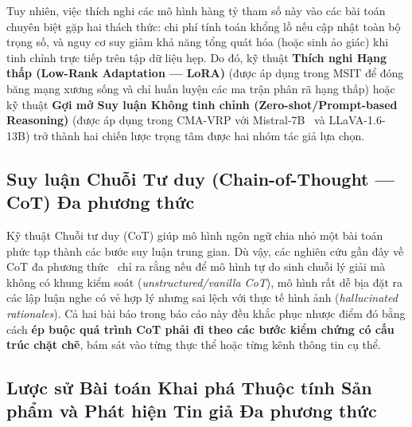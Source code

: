 \documentclass[conference,10pt]{IEEEtran}
\begin{document}
Tuy nhiên, việc thích nghi các mô hình hàng tỷ tham số này vào các bài toán chuyên biệt gặp hai thách thức: chi phí tính toán khổng lồ nếu cập nhật toàn bộ trọng số, và nguy cơ suy giảm khả năng tổng quát hóa (hoặc sinh ảo giác) khi tinh chỉnh trực tiếp trên tập dữ liệu hẹp. Do đó, kỹ thuật \textbf{Thích nghi Hạng thấp (Low-Rank Adaptation --- LoRA)} (được áp dụng trong MSIT để đóng băng mạng xương sống và chỉ huấn luyện các ma trận phân rã hạng thấp) hoặc kỹ thuật \textbf{Gợi mở Suy luận Không tinh chỉnh (Zero-shot/Prompt-based Reasoning)} (được áp dụng trong CMA-VRP với Mistral-7B~\cite{jiang2023mistral} và LLaVA-1.6-13B) trở thành hai chiến lược trọng tâm được hai nhóm tác giả lựa chọn.

\subsection{Suy luận Chuỗi Tư duy (Chain-of-Thought --- CoT) Đa phương thức}

Kỹ thuật Chuỗi tư duy (CoT) giúp mô hình ngôn ngữ chia nhỏ một bài toán phức tạp thành các bước suy luận trung gian. Dù vậy, các nghiên cứu gần đây về CoT đa phương thức~\cite{zhang2023mmcot} chỉ ra rằng nếu để mô hình tự do sinh chuỗi lý giải mà không có khung kiểm soát (\textit{unstructured/vanilla CoT}), mô hình rất dễ bịa đặt ra các lập luận nghe có vẻ hợp lý nhưng sai lệch với thực tế hình ảnh (\textit{hallucinated rationales}). Cả hai bài báo trong báo cáo này đều khắc phục nhược điểm đó bằng cách \textbf{ép buộc quá trình CoT phải đi theo các bước kiểm chứng có cấu trúc chặt chẽ}, bám sát vào từng thực thể hoặc từng kênh thông tin cụ thể.

\subsection{Lược sử Bài toán Khai phá Thuộc tính Sản phẩm và Phát hiện Tin giả Đa phương thức}
\end{document}
